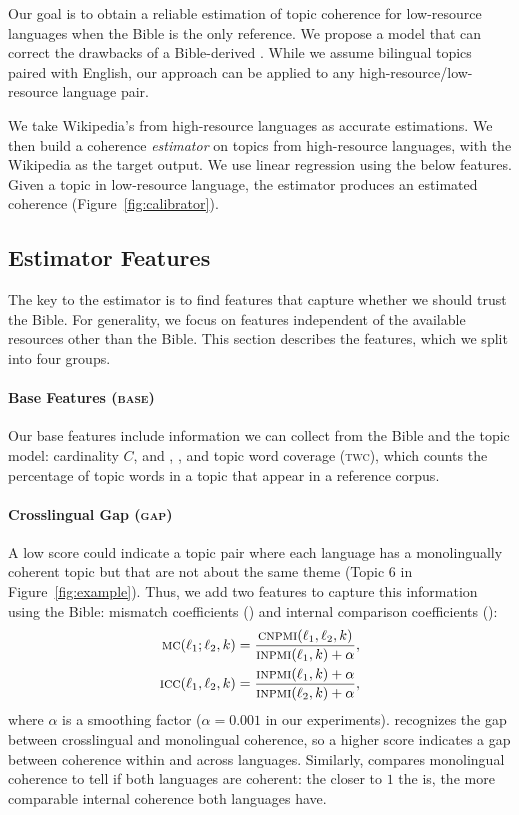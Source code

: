 Our goal is to obtain a reliable estimation of topic coherence for
low-resource languages when the Bible is the only reference.  We
propose a model that can correct the drawbacks of a Bible-derived
\cnpmi{}.  While we assume bilingual topics paired with
English, our approach can be applied to any high-resource/low-resource
language pair.




We take Wikipedia's \cnpmi{} from high-resource languages as accurate
estimations.  We then build a coherence
\textit{estimator} 
on topics from high-resource languages, with the Wikipedia \cnpmi{} as
the target output.  We use linear regression using the below features.
Given a topic in low-resource language, the estimator produces an
estimated coherence (Figure~\ref{fig:calibrator}).


\subsection{Estimator Features}

The key to the estimator is to find features that capture whether
we should trust the Bible.
For generality, we focus on features independent
of the available resources other than the Bible.
This section describes the features, which we split into four groups.

\paragraph{Base Features (\textsc{base})}
Our base features include information we can collect from
the Bible and the topic model:
cardinality $C$, \cnpmi{} and \inpmi{}, \mta{}, and topic word coverage (\textsc{twc}),
which counts the percentage of topic words in a topic that appear in a reference corpus.

\paragraph{Crosslingual Gap (\textsc{gap})}

A low \cnpmi{} score could indicate a topic pair where each language has
a monolingually coherent topic but that are not about the same theme
(Topic 6 in Figure~\ref{fig:example}). Thus, we add two features to
capture this information using the Bible: mismatch coefficients (\mc{}) and
internal comparison coefficients (\icc{}):
\begin{align}
\textsc{mc}{}({\ell_1 ; \ell_2,k}) &= \frac{\textsc{cnpmi}{}(\ell_1,\ell_2,k)}{\textsc{inpmi}{}(\ell_1,k) + \alpha},\\
\textsc{icc}{}(\ell_1,\ell_2,k) &= \frac{\textsc{inpmi}{}(\ell_1,k) + \alpha}{\textsc{inpmi}{}(\ell_2,k) + \alpha},
\end{align}
where $\alpha$ is a smoothing factor ($\alpha=0.001$ in our
experiments). \mc{} recognizes the gap between crosslingual and monolingual coherence,
so a higher \mc{} score indicates a gap between coherence within and across languages.
Similarly, \icc{} compares monolingual coherence to tell if both languages are coherent:
the closer to $1$ the \icc{} is,
the more comparable internal coherence both languages have.

